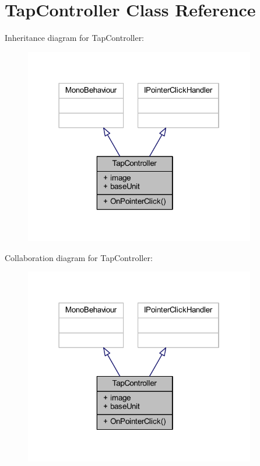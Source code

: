 \hypertarget{class_tap_controller}{}\section{Tap\+Controller Class Reference}
\label{class_tap_controller}


Inheritance diagram for Tap\+Controller\+:
\nopagebreak
\begin{figure}[H]
\begin{center}
\leavevmode
\includegraphics[width=286pt]{class_tap_controller__inherit__graph}
\end{center}
\end{figure}


Collaboration diagram for Tap\+Controller\+:
\nopagebreak
\begin{figure}[H]
\begin{center}
\leavevmode
\includegraphics[width=286pt]{class_tap_controller__coll__graph}
\end{center}
\end{figure}
